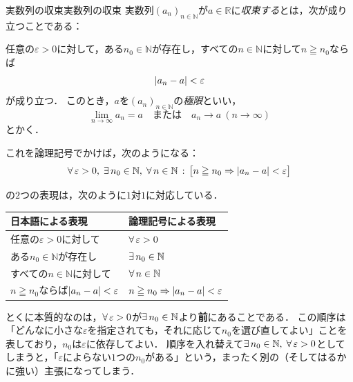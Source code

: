 \begin{definition}{実数列の収束}{実数列の収束}
  実数列$(a_n)_{n \in \mathbb{N}}$が$a \in \mathbb{R}$に\emph{収束する}とは，次が成り立つことである：

  任意の$\varepsilon > 0$に対して，ある$n_0 \in \mathbb{N}$が存在し，すべての$n \in \mathbb{N}$に対して$n \geqq n_0$ならば
  \[
    \abs*{a_n - a} < \varepsilon
  \]
  が成り立つ．
  このとき，$a$を$(a_n)_{n \in \mathbb{N}}$の\emph{極限}といい，
  \[
    \lim_{n \to \infty} a_n = a
    \quad\text{または}\quad
    a_n \to a~(n \to \infty)
  \]
  とかく．

  これを論理記号でかけば，次のようになる：
  \[
    \lall{\varepsilon > 0} \lsep \lex{n_0 \in \mathbb{N}} \lsep \lall{n \in \mathbb{N}} \lst
    \bigl[ n \geqq n_0 \limp \abs*{a_n - a} < \varepsilon \bigr]
  \]
\end{definition}

\begin{remark}[日本語の言い回しと論理式の対応]
  の$2$つの表現は，次のように$1$対$1$に対応している．
  \begin{center}
    \begin{tabular}{l|l}
      \hline
      日本語による表現                                  & 論理記号による表現                              \\
      \hline
      任意の$\varepsilon > 0$に対して                   & $\lall{\varepsilon > 0}$                        \\
      ある$n_0 \in \mathbb{N}$が存在し                  & $\lex{n_0 \in \mathbb{N}}$                      \\
      すべての$n \in \mathbb{N}$に対して                & $\lall{n \in \mathbb{N}}$                       \\
      $n \geqq n_0$ならば$\abs{a_n - a} < \varepsilon$  & $n \geqq n_0 \limp \abs{a_n - a} < \varepsilon$ \\
      \hline
    \end{tabular}
  \end{center}

  とくに本質的なのは，$\lall{\varepsilon > 0}$が$\lex{n_0 \in \mathbb{N}}$より\textbf{前}にあることである．
  この順序は「どんなに小さな$\varepsilon$を指定されても，それに応じて$n_0$を選び直してよい」ことを表しており，$n_0$は$\varepsilon$に依存してよい．
  順序を入れ替えて$\lex{n_0 \in \mathbb{N}} \lsep \lall{\varepsilon > 0}$としてしまうと，「$\varepsilon$によらない$1$つの$n_0$がある」という，まったく別の（そしてはるかに強い）主張になってしまう．
\end{remark}

